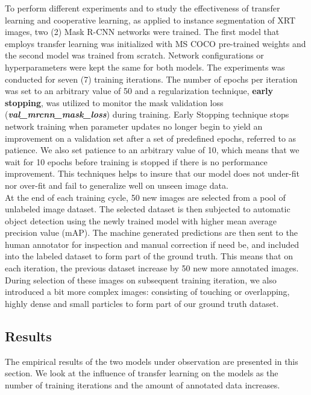 \documentclass[conference]{IEEEtran}
\begin{document}
		To perform different experiments and to study the effectiveness of transfer	learning and cooperative learning, as applied to instance segmentation of XRT images, two (2) Mask R-CNN networks were trained. The first model that employs transfer learning
was initialized with MS COCO pre-trained weights and the second model was trained from scratch. Network configurations or hyperparameters were kept the same for both models.	The experiments was conducted for seven (7) training iterations. The number of epochs per
iteration was set to an arbitrary value of 50 and a regularization technique, \textbf{early stopping},
was utilized to monitor the mask validation loss (\textbf{\textit{val\_mrcnn\_mask\_loss}}) during training.
Early Stopping technique stops network training when parameter updates no longer begin
to yield an improvement on a validation set after a set of predefined epochs, referred to as
patience. We also set patience to an arbitrary value of 10, which means that we wait for 10
epochs before training is stopped if there is no performance improvement. This techniques
helps to insure that our model does not under-fit nor over-fit and fail to generalize well on
unseen image data.
\\
		
		At the end of each training cycle, 50 new images are selected from a pool of unlabeled
image dataset. The selected dataset is then subjected to automatic object detection using
the newly trained model with higher mean average precision value (mAP). The machine
generated predictions are then sent to the human annotator for inspection and manual
correction if need be, and included into the labeled dataset to form part of the ground	truth. This means that on each iteration, the previous dataset increase by 50 new more
annotated images. During selection of these images on subsequent training iteration, we
also introduced a bit more complex images: consisting of touching or overlapping, highly
dense and small particles to form part of our ground truth dataset.\\
		
	\subsection{Results}
	
		The empirical results of the two models under observation are presented in this section. We
look at the influence of transfer learning on the models as the number of training iterations
and the amount of annotated data increases.\\
		
\end{document}

